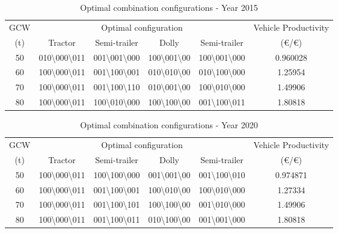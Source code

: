 \documentclass[ExampleMasters.tex]{subfiles}
\begin{document}
\begin{table}[ht]
\caption{Optimal combination configurations - Year 2015}
\centering
\begin{tabular}{c c c c c c}
\hline\hline
GCW & \multicolumn{4}{c}{Optimal configuration} & Vehicle Productivity \\ \cline{2-5}
(t) & Tractor & Semi-trailer & Dolly & Semi-trailer & (\euro/\euro)\\ 
\hline
50 & 010\textbackslash000\textbackslash011 &
	 001\textbackslash001\textbackslash000 & 100\textbackslash001\textbackslash00 &
	 100\textbackslash001\textbackslash000 & 0.960028 \\
60 & 100\textbackslash000\textbackslash011 &
	 001\textbackslash100\textbackslash001 & 010\textbackslash010\textbackslash00 &
	 010\textbackslash100\textbackslash000 & 1.25954 \\
70 & 100\textbackslash000\textbackslash011 & 
	 001\textbackslash100\textbackslash110 & 010\textbackslash001\textbackslash00  & 
	 100\textbackslash010\textbackslash000 & 1.49906 \\
80 & 100\textbackslash000\textbackslash011 &
	 100\textbackslash010\textbackslash000 & 100\textbackslash100\textbackslash00 &
	 001\textbackslash100\textbackslash011 & 1.80818 \\
\hline
\end{tabular}
\label{table:optComb2015}
\end{table}

\begin{table}[ht]
\caption{Optimal combination configurations - Year 2020}
\centering
\begin{tabular}{c c c c c c}
\hline\hline
GCW & \multicolumn{4}{c}{Optimal configuration} & Vehicle Productivity \\ \cline{2-5}
(t) & Tractor & Semi-trailer & Dolly & Semi-trailer & (\euro/\euro)\\ 
\hline
50 & 100\textbackslash000\textbackslash011 &
	 100\textbackslash100\textbackslash000  & 001\textbackslash001\textbackslash00  & 
	 001\textbackslash100\textbackslash010 & 0.974871 \\
60 & 100\textbackslash000\textbackslash011 & 
	 001\textbackslash100\textbackslash001 & 100\textbackslash010\textbackslash00 &
	 100\textbackslash010\textbackslash000 & 1.27334 \\
70 & 100\textbackslash000\textbackslash011 &
	 001\textbackslash100\textbackslash101 & 100\textbackslash100\textbackslash00 &
	 001\textbackslash010\textbackslash000 & 1.49906 \\
80 & 100\textbackslash000\textbackslash011 & 
	 001\textbackslash100\textbackslash011 & 010\textbackslash100\textbackslash00 &
	 001\textbackslash001\textbackslash000 & 1.80818 \\
\hline
\end{tabular}
\label{table:optComb2020}
\end{table}
\end{document}
